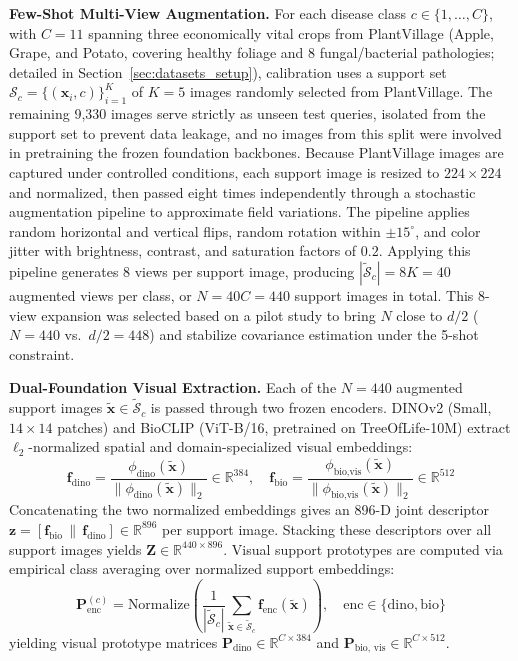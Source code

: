 \documentclass[conference]{IEEEtran}
\begin{document}
\textbf{Few-Shot Multi-View Augmentation.} For each disease class $c \in \{1, \dots, C\}$, with $C=11$ spanning three economically vital crops from PlantVillage (Apple, Grape, and Potato, covering healthy foliage and 8 fungal/bacterial pathologies; detailed in Section~\ref{sec:datasets_setup}), calibration uses a support set $\mathcal{S}_c = \{(\mathbf{x}_i, c)\}_{i=1}^K$ of $K=5$ images randomly selected from PlantVillage. The remaining 9,330 images serve strictly as unseen test queries, isolated from the support set to prevent data leakage, and no images from this split were involved in pretraining the frozen foundation backbones. Because PlantVillage images are captured under controlled conditions, each support image is resized to $224 \times 224$ and normalized, then passed eight times independently through a stochastic augmentation pipeline to approximate field variations. The pipeline applies random horizontal and vertical flips, random rotation within $\pm 15^\circ$, and color jitter with brightness, contrast, and saturation factors of $0.2$. Applying this pipeline generates 8 views per support image, producing $|\tilde{\mathcal{S}}_c| = 8K = 40$ augmented views per class, or $N = 40C = 440$ support images in total. This 8-view expansion was selected based on a pilot study to bring $N$ close to $d/2$ ($N=440$ vs.\ $d/2=448$) and stabilize covariance estimation under the 5-shot constraint.

\textbf{Dual-Foundation Visual Extraction.} Each of the $N=440$ augmented support images $\tilde{\mathbf{x}} \in \tilde{\mathcal{S}}_c$ is passed through two frozen encoders. DINOv2 (Small, $14 \times 14$ patches) \cite{oquab2023dinov2} and BioCLIP (ViT-B/16, pretrained on TreeOfLife-10M) \cite{stevens2024bioclip} extract $\ell_2$-normalized spatial and domain-specialized visual embeddings:
\begin{equation}
    \mathbf{f}_{\text{dino}} = \frac{\phi_{\text{dino}}(\tilde{\mathbf{x}})}{\|\phi_{\text{dino}}(\tilde{\mathbf{x}})\|_2} \in \mathbb{R}^{384}, \quad
    \mathbf{f}_{\text{bio}} = \frac{\phi_{\text{bio,vis}}(\tilde{\mathbf{x}})}{\|\phi_{\text{bio,vis}}(\tilde{\mathbf{x}})\|_2} \in \mathbb{R}^{512}
\end{equation}
Concatenating the two normalized embeddings gives an 896-D joint descriptor $\mathbf{z} = [\mathbf{f}_{\text{bio}} \,\|\, \mathbf{f}_{\text{dino}}] \in \mathbb{R}^{896}$ per support image. Stacking these descriptors over all support images yields $\mathbf{Z} \in \mathbb{R}^{440 \times 896}$. Visual support prototypes are computed via empirical class averaging over normalized support embeddings:
\begin{equation}
    \mathbf{P}_{\text{enc}}^{(c)} = \text{Normalize}\left(\frac{1}{|\tilde{\mathcal{S}}_c|}\sum_{\tilde{\mathbf{x}} \in \tilde{\mathcal{S}}_c} \mathbf{f}_{\text{enc}}(\tilde{\mathbf{x}})\right), \quad \text{enc} \in \{\text{dino}, \text{bio}\}
\end{equation}
yielding visual prototype matrices $\mathbf{P}_{\text{dino}} \in \mathbb{R}^{C \times 384}$ and $\mathbf{P}_{\text{bio, vis}} \in \mathbb{R}^{C \times 512}$.
\end{document}
